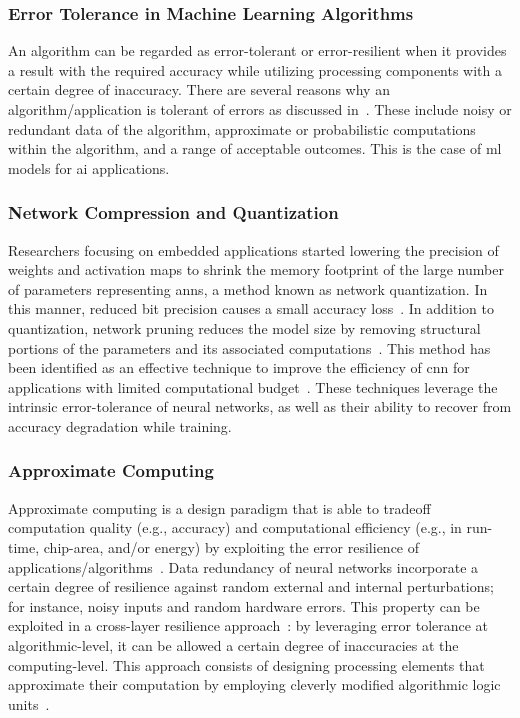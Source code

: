 \subsubsection{Error Tolerance in Machine Learning Algorithms}
An algorithm can be regarded as error-tolerant or error-resilient when it provides a result with the required accuracy while utilizing processing components with a certain degree of inaccuracy. There are several reasons why an algorithm/application is tolerant of errors as discussed in~\cite{chippa2013analysis}. These include noisy or redundant data of the algorithm, approximate or probabilistic computations within the algorithm, and a range of acceptable outcomes. This is the case of \gls{ml} models for \gls{ai} applications.

\subsubsection{Network Compression and Quantization}
Researchers focusing on embedded applications started lowering the precision of weights and activation maps to shrink the memory footprint of the large number of parameters representing \glspl{ann}, a method known as network quantization. In this manner, reduced bit precision causes a small accuracy loss~\cite{courbariaux2015binaryconnect, han2015deep, hubara2017quantized, rastegari2016xnor}. In addition to quantization, network pruning reduces the model size by removing structural portions of the parameters and its associated computations~\cite{lecun1989optimal,hassibi1992second}. This method has been identified as an effective technique to improve the efficiency of \gls{cnn} for applications with limited computational budget~\cite{molchanov2016pruning,li2016pruning, liu2018rethinking}. These techniques leverage the intrinsic error-tolerance of neural networks, as well as their ability to recover from accuracy degradation while training.

\subsubsection{Approximate Computing}
Approximate computing is a design paradigm that is able to tradeoff computation quality (e.g., accuracy) and computational efficiency (e.g., in run-time, chip-area, and/or energy) by exploiting the error resilience of applications/algorithms~\cite{gillani2020exploiting, zhang2015approxann}. Data redundancy of neural networks incorporate a certain degree of resilience against random external and internal perturbations;
for instance, noisy inputs and random hardware errors. This property can be exploited in a cross-layer resilience approach~\cite{carter2010design}: by leveraging error tolerance at algorithmic-level, it can be allowed a certain degree of inaccuracies at the computing-level. This approach consists of designing processing elements that approximate their computation by employing cleverly modified algorithmic logic units~\cite{han2013approximate}.

